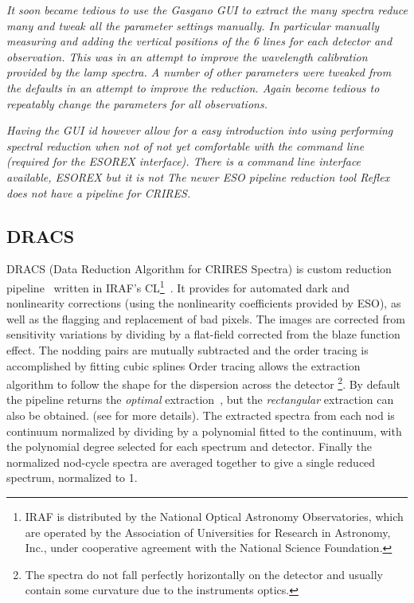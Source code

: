 \textit{It soon became tedious to use the Gasgano GUI to extract the many spectra reduce many and tweak all the parameter settings manually. In particular manually measuring and adding the vertical positions of the 6 \thar lines for each detector and observation. This was in an attempt to improve the wavelength calibration provided by the \thar lamp spectra.
A number of other parameters were tweaked from the defaults in an attempt to improve the reduction. Again become tedious to repeatably change the parameters for all observations.}

\textit{Having the GUI id however allow for a easy introduction into using performing spectral reduction when not of not yet comfortable with the command line (required for the ESOREX interface).
There is a command line interface available, ESOREX but it is not The newer ESO pipeline reduction tool Reflex does not have a pipeline for CRIRES. }


\subsection{DRACS}
DRACS (Data Reduction Algorithm for CRIRES Spectra) is custom reduction pipeline~\citep{figueira_radial_2010} written in IRAF's CL\footnote{IRAF is distributed by the National Optical Astronomy Observatories, which are operated by the Association of Universities for Research in Astronomy, {Inc.}, under cooperative agreement with the National Science Foundation.}~\citep{tody_iraf_1993}. It provides for automated dark and nonlinearity corrections (using the nonlinearity coefficients provided by ESO), as well as the flagging and replacement of bad pixels. The images are corrected from sensitivity variations by dividing by a flat-field corrected from the blaze function effect. The nodding pairs are mutually subtracted and the order tracing is accomplished by fitting cubic splines
Order tracing allows the extraction algorithm to follow the shape for the dispersion across the detector \footnote{The spectra do not fall perfectly horizontally on the detector and usually contain some curvature due to the instruments optics.}. 
By default the pipeline returns the \emph{optimal }extraction~\citep{horne_optimal_1986}, but the \emph{rectangular} extraction can also be obtained. (see  for more details).
The extracted spectra from each nod is continuum normalized by dividing by a polynomial fitted to the continuum, with the polynomial degree selected for each spectrum and detector. Finally the normalized nod-cycle spectra are averaged together to give a single reduced spectrum, normalized to 1.

